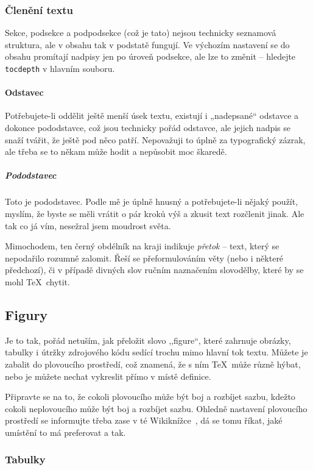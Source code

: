 \subsubsection{Členění textu}

Sekce, podsekce a podpodsekce (což je tato) nejsou technicky seznamová
struktura, ale v obsahu tak v podstatě fungují. Ve výchozím nastavení se do
obsahu promítají nadpisy jen po úroveň podsekce, ale lze to změnit -- hledejte
\texttt{tocdepth} v hlavním souboru.

\paragraph{Odstavec}
Potřebujete-li oddělit ještě menší úsek textu, existují i „nadepsané“ odstavce
a dokonce pododstavce, což jsou technicky pořád odstavce, ale jejich nadpis se
snaží tvářit, že ještě pod něco patří. Nepovažuji to úplně za typografický
zázrak, ale třeba se to někam může hodit a nepůsobit moc škaredě.

\subparagraph{Pododstavec}
Toto je pododstavec. Podle mě je úplně hnusný a potřebujete-li nějaký použít,
myslím, že byste se měli vrátit o pár kroků výš a zkusit text rozčlenit jinak.
Ale tak co já vím, nesežral jsem moudrost světa.

\bigskip
Mimochodem, ten černý obdélník na kraji indikuje \emph{přetok} -- text, který se
nepodařilo rozumně zalomit. Řeší se přeformulováním věty (nebo i některé
předchozí), či v případě divných slov ručním na\-zna\-če\-ním slo\-vo\-děl\-by,
které by se mohl \TeX\ chytit.


\subsection{Figury}

Je to tak, pořád netuším, jak přeložit slovo ,,figure``, které zahrnuje obrázky,
tabulky i útržky zdrojového kódu sedící trochu mimo hlavní tok textu. Můžete je
zabalit do plovoucího prostředí, což znamená, že s ním \TeX\ může různě hýbat,
nebo je můžete nechat vykreslit přímo v místě definice.

Připravte se na to, že cokoli plovoucího může být boj a rozbíjet sazbu, kdežto
cokoli neplovoucího může být boj a rozbíjet sazbu. Ohledně nastavení plovoucího
prostředí se informujte třeba zase v té Wikiknížce~\cite{wb}, dá se tomu říkat,
jaké umístění to má preferovat a tak.

\subsubsection{Tabulky}

